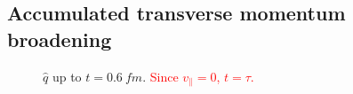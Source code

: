 \begin{figure}
\centering

\caption{}
\label{fig:GBW_dEdx_sweeping_v}
\end{figure}

\subsection{Accumulated transverse momentum broadening}

\begin{figure}
\centering

\caption{$\hat{q}$ up to $t = \qty{0.6}{fm}$. \textcolor{red}{Since $v_\parallel=0$, $t=\tau$.} }
\label{fig:qHat_0.6}
\end{figure}